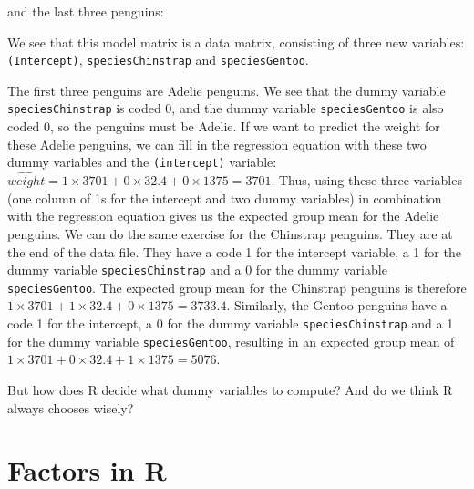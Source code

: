 and the last three penguins:

\begin{knitrout}
\color{fgcolor}
\end{knitrout}

We see that this model matrix is a data matrix, consisting of three new variables: \texttt{(Intercept)}, \texttt{speciesChinstrap} and \texttt{speciesGentoo}.

The first three penguins are Adelie penguins. We see that the dummy variable \texttt{speciesChinstrap} is coded 0, and the dummy variable \texttt{speciesGentoo} is also coded 0, so the penguins must be Adelie. If we want to predict the weight for these Adelie penguins, we can fill in the regression equation with these two dummy variables and the \texttt{(intercept)} variable: $\hat{weight} = 1 \times 3701 + 0 \times 32.4 + 0 \times 1375 = 3701$. Thus, using these three variables (one column of 1s for the intercept and two dummy variables) in combination with the regression equation gives us the expected group mean for the Adelie penguins. We can do the same exercise for the Chinstrap penguins. They are at the end of the data file. They have a code 1 for the intercept variable, a 1 for the dummy variable \texttt{speciesChinstrap} and a 0 for the dummy variable \texttt{speciesGentoo}. The expected group mean for the Chinstrap penguins is therefore $ 1 \times 3701 + 1 \times 32.4 + 0 \times 1375 = 3733.4$. Similarly, the Gentoo penguins have a code 1 for the intercept, a 0 for the dummy variable \texttt{speciesChinstrap} and a 1 for the dummy variable \texttt{speciesGentoo}, resulting in an expected group mean of $ 1 \times 3701 + 0 \times 32.4 + 1 \times 1375 = 5076$.

But how does R decide what dummy variables to compute? And do we think R always chooses wisely?

\section{Factors in R}

